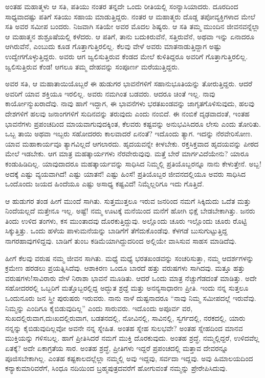 ಅಂತಹ ಮಹಾತ್ಮಳು ಆ ಸತಿ, ಪತಿಯು ನಂತರ ತನ್ನದೇ ಒಂದು ರೀತಿಯಲ್ಲಿ ಸಂನ್ಯಾಸಿಯಾದರು. ದೂರದಿಂದ ಸಾಧ್ಯವಾದಷ್ಟು ಪತಿಗೆ ಸತಿಯು ಸಹಾಯ ಮಾಡುತ್ತಿದ್ದರು. ನಂತರ ಆ ಮಹಾತ್ಮರು ದೊಡ್ಡ ತಪೋವ್ಯಕ್ತಿಗಳಾದ ಮೇಲೆ ಸತಿ ಅವರ ಸಮೀಪ ಬಂದರು. ನಿಜವಾಗಿ ಸತಿಯೇ ಅವರ ಮೊದಲ ಶಿಷ್ಯರು. ಆ ಸತಿ ತಮ್ಮ ಮುಂದಿನ ಜೀವನವನ್ನೆಲ್ಲಾ ಆ ಮಹಾತ್ಮನ ಶುಶ್ರೂಷೆಯಲ್ಲಿ ಕಳೆದರು. ಆ ಪತಿಗೆ, ತಾನು ಬದುಕಿರುವೆನೆ, ಸತ್ತಿರುವೆನೆ, ಅಥವಾ ಇನ್ನು ಏನಾದರೂ ಆಗಿರುವೆನೆ, ಎಂಬುದು ಕೂಡ ಗೊತ್ತಾಗುತ್ತಿರಲಿಲ್ಲ. ಕೆಲವು ವೇಳೆ ಅವರು ಮಾತನಾಡುತ್ತಿದ್ದಾಗ ಅಷ್ಟು ಉದ್ವೇಗಗೊಳ್ಳುತ್ತಿದ್ದರು. ಅವರು ಆಗ ಜ್ವಲಿಸುತ್ತಿರುವ ಕೆಂಡದ ಮೇಲೆ ಕುಳಿತಿದ್ದರೂ ಅವರಿಗೆ ಗೊತ್ತಾಗುತ್ತಿರಲಿಲ್ಲ. ಜ್ವಲಿಸುತ್ತಿರುವ ಕೆಂಡ! ಆಗಲೂ ತಮ್ಮ ದೇಹವನ್ನು ಸಂಪೂರ್ಣ ಮರೆಯುತ್ತಿದ್ದರು.

ಅವರ ಸತಿ, ಆ ಮಹಾತಾಯಿಯೊಬ್ಬರೆ ಈ ಹುಡುಗರ ಭಾವನೆಗಳಿಗೆ ಸಹಾನುಭೂತಿಯನ್ನು ತೋರುತ್ತಿದ್ದರು. ಆದರೆ ಅವರಿಗೆ ಯಾವ ಶಕ್ತಿಯೂ ಇರಲಿಲ್ಲ. ಅವರು ನಮಗಿಂತ ಬಡವರು. ಆದರೂ ಚಿಂತೆ ಇಲ್ಲ. ನಾವು ಕಾರ್ಯೋನ್ಮುಖರಾದೆವು. ನಾವು ಹಾಗೆ ಇದ್ದಾಗ, ಈ ಭಾವನೆಗಳು ಭರತಖಂಡವನ್ನು ಜಾಗೃತಗೊಳಿಸುವುದು, ಹಲವು ದೇಶಗಳಿಗೆ ಹಲವು ಜನಾಂಗಗಳಿಗೆ ಸುದಿನವನ್ನು ತರುವುದು ಎಂದು ನಂಬಿದೆ. ಈ ನಂಬಿಕೆ ದೃಢವಾದಂತೆ, ಇಂತಹ ಭಾವನೆಗಳು ಪ್ರಪಂಚದಿಂದ ಮಾಯವಾಗುವುದಕ್ಕಿಂತ, ಕೆಲವರು ಕಷ್ಟವನ್ನು ಅನುಭವಿಸಿದರೂ ಲೇಸು ಎಂದು ತೋರಿತು. ಒಬ್ಬ ತಾಯಿ ಅಥವಾ ಇಬ್ಬರು ಸಹೋದರರು ಕಾಲವಾದರೆ ಏನಂತೆ? ಇದೊಂದು ತ್ಯಾಗ. ಇದನ್ನು ನೆರವೇರಿಸೋಣ. ಯಾವ ಮಹಾಕಾರ್ಯವೂ ತ್ಯಾಗವಿಲ್ಲದೆ ಆಗಲಾರದು. ಹೃದಯವನ್ನೇ ಕೀಳಬೇಕು. ರಕ್ತಸಿಕ್ತವಾದ ಹೃದಯವನ್ನು ಪೀಠದ ಮೇಲೆ ಇಡಬೇಕು. ಆಗ ಮಾತ್ರ ಮಹತ್ಕಾರ್ಯಗಳು ನೆರವೇರುವುವು. ಮತ್ತೆ ಬೇರೆ ಮಾರ್ಗವಿದೆಯೇನು? ಯಾರೂ ಕಂಡುಹಿಡಿದಿಲ್ಲ. ಯಾವುದಾದರೂ ಮಹತ್ಕಾರ್ಯವನ್ನು ಸಾಧಿಸಿದ ನಿಮ್ಮಲ್ಲಿ ಪ್ರತಿಯೊಬ್ಬರನ್ನೂ ನಾನು ಕೇಳುತ್ತೇನೆ. ಅಬ್ಬ! ಅದಕ್ಕೆ ಎಷ್ಟು ವ್ಯಯವಾಗಿದೆ! ಎಷ್ಟು ಯಾತನೆ! ಎಷ್ಟು ಹಿಂಸೆ! ಪ್ರತಿಯೊಬ್ಬರ ಜೀವನದಲ್ಲಿಯೂ ಅವರು ಸಾಧಿಸಿದ ಒಂದೊಂದು ಜಯದ ಹಿಂದೆಯೂ ಎಷ್ಟು ಅಸಾಧ್ಯ ಕಷ್ಟವಿದೆ! ನಿಮ್ಮೆಲ್ಲರಿಗೂ ಇದು ಗೊತ್ತಿದೆ.

\vskip  2pt

ಆ ಹುಡುಗರ ತಂಡ ಹೀಗೆ ಮುಂದೆ ಸಾಗಿತು. ಸುತ್ತಮುತ್ತಲೂ ಇರುವ ಜನರಿಂದ ನಮಗೆ ಸಿಕ್ಕಿದುದು ಒದೆತ ಮತ್ತು ನಿಂದೆಯಲ್ಲದೆ ಮತ್ತೇನೂ ಇಲ್ಲ. ಅಷ್ಟೆ! ನಮ್ಮ ಊಟಕ್ಕೆ ಮನೆಯಿಂದ ಮನೆಗೆ ಹೋಗಿ ಭಿಕ್ಷೆ ಬೇಡಬೇಕಾಗಿತ್ತು. ಜನರು ತಿಂದು ಉಳಿದ ತಂಗಳು, ಕಸ ಮುಂತಾದವು ದೊರಕುತ್ತಿದ್ದುವು. ಅಲ್ಲೊಂದು ಚೂರು ಇಲ್ಲೊಂದು ಚೂರು ರೊಟ್ಟಿ ಸಿಕ್ಕುತ್ತಿತ್ತು. ಒಂದು ಹಳೆಯ ಪಾಳುಮನೆಯನ್ನು ಬಾಡಿಗೆಗೆ ತೆಗೆದುಕೊಂಡೆವು. ಕೆಳಗಡೆ ಬುಸುಗುಟ್ಟುತ್ತಿದ್ದ ನಾಗರಹಾವುಗಳಿದ್ದವು. ಬಾಡಿಗೆ ತುಂಬ ಕಡಿಮೆಯಾಗಿದ್ದುದರಿಂದ ಅಲ್ಲಿಯೇ ವಾಸಿಸುವ ಸಾಹಸ ಮಾಡಿದೆವು.

\vskip  2pt

ಹೀಗೆ ಕೆಲವು ವರುಷ ನಮ್ಮ ಜೀವನ ಸಾಗಿತು. ಮಧ್ಯೆ ಮಧ್ಯೆ ಭರತಖಂಡವನ್ನು ಸಂಚರಿಸುತ್ತಾ, ನಮ್ಮ ಆದರ್ಶಗಳನ್ನು ಕ್ರಮೇಣ ಹರಡಲು ಪ್ರಯತ್ನಿಸಿದೆವು. ಆಶಾಕಿರಣ ಒಂದೂ ಬಾರದೆ ಹತ್ತು ವರುಷಗಳು ಸಾಗಿದವು. ಮತ್ತೂ ಹತ್ತು ವರುಷಗಳು!ಸಾವಿರಾರು ವೇಳೆ ನಿರಾಶಾ ಭಾವನೆ ಮೂಡಿತು. ಆದರೆ ಒಂದು ಮಾತ್ರ ನೆಚ್ಚುಗೆಡದಂತೆ ಮಾಡಿತ್ತು. ಅದೇ ಸಹೋದರರಲ್ಲಿ ಒಬ್ಬರಿಗೆ ಮತ್ತೊಬ್ಬರಲ್ಲಿದ್ದ ಅದ್ಭುತ ಶ್ರದ್ದೆ ಮತ್ತು ಅನನ್ಯಸಾಧಾರಣ ಪ್ರೀತಿ. ಇಂದು ನನ್ನ ಸುತ್ತಲೂ ಒಂದುನೂರು ಜನ ಸ್ತ್ರೀ ಪುರುಷರು ಇರುವರು. ನಾನು ನಾಳೆ ದುಷ್ಟನಾದರೂ “ನಾವು ನಿಮ್ಮ ಸಮೀಪದಲ್ಲೆ ಇರುವೆವು. ನಿಮ್ಮನ್ನು ಎಂದಿಗೂ ಕೈಬಿಡುವುದಿಲ್ಲ” ಎಂದು ಸಾರುವರು. ಇದೊಂದು ಅಪೂರ್ವ ವರ, ಸುಖದಲ್ಲಿರುವಾಗ,\break ದುಃಖದಲ್ಲಿರುವಾಗ, ಬಡತನದಲ್ಲಿ, ನೋವಿನಲ್ಲಿ, ಸಾವಿನಲ್ಲಿ, ಸ್ವರ್ಗದಲ್ಲಿ, ನರಕದಲ್ಲಿ, ಯಾರು ನನ್ನನ್ನು ಕೈಬಿಡುವುದಿಲ್ಲವೋ ಅವನೇ ನನ್ನ ಸ್ನೇಹಿತ. ಅಂತಹ ಸ್ನೇಹ ಸುಲಭವೇ? ಅಂತಹ ಸ್ನೇಹದಿಂದ ಮಾನವ ಮುಕ್ತಿಯನ್ನು ಗಳಿಸಬಲ್ಲ. ಹಾಗೆ ಪ್ರೀತಿಸಿದರೆ ನಮಗೆ ಮುಕ್ತಿ ದೊರಕುವುದು. ಅಂತಹ ಶ್ರದ್ಧೆ, ನಮ್ಮಲ್ಲಿದ್ದರೆ, ಉಳಿದವೆಲ್ಲ ಏತಕ್ಕೆ? ಅದೇ ಏಕಾಗ್ರತೆಯ ಸಾರ. ಅಂತಹ ಶ್ರದ್ಧೆ, ಪ್ರೀತಿಗಳು ಇದ್ದರೆ ಪ್ರಪಂಚದಲ್ಲಿ ಮತ್ತಾವ ದೇವರನ್ನೂ ಪೂಜಿಸಬೇಕಾಗಿಲ್ಲ. ಎಂತಹ ಕಷ್ಟಕಾಲದಲ್ಲೆಲ್ಲಾ ನಮ್ಮಲ್ಲಿ ಅವು ಇದ್ದವು, ಸರ್ವದಾ ಇದ್ದವು. ಅವು ಹಿಮಾಲಯದಿಂದ ಕನ್ಯಾಕುಮಾರಿವರೆಗೆ, ಸಿಂಧೂ ನದಿಯಿಂದ ಬ್ರಹ್ಮಪುತ್ರದವರೆಗೆ ಹೋಗುವಂತೆ ನಮ್ಮನ್ನು ಪ್ರೇರೇಪಿಸಿದುವು.

